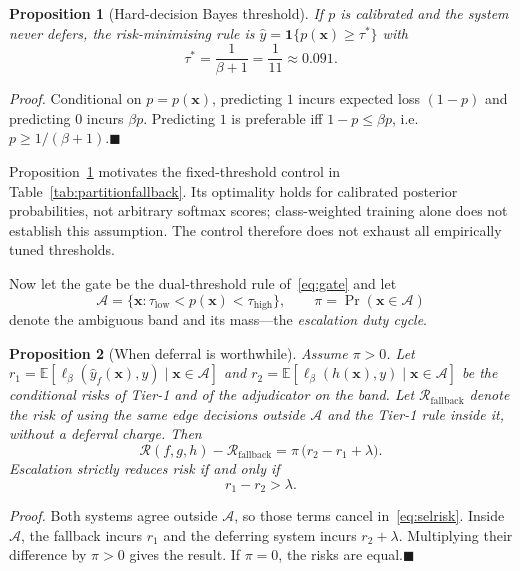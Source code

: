 \documentclass[journal]{IEEEtran}
\newtheorem{proposition}{Proposition}
\newcommand{\proofpar}[1]{\par\noindent\textit{Proof.} #1\hfill$\blacksquare$\par\medskip}
\begin{document}
\begin{proposition}[Hard-decision Bayes threshold]
\label{prop:bayes}
If $p$ is calibrated and the system never defers, the risk-minimising rule is $\hat{y}=\mathbf{1}\{p(\mathbf{x})\ge\tau^\ast\}$ with
\begin{equation}
\tau^{\ast}=\frac{1}{\beta+1}=\frac{1}{11}\approx 0.091 .
\label{eq:tau_star}
\end{equation}
\end{proposition}
\proofpar{Conditional on $p=p(\mathbf{x})$, predicting $1$ incurs expected loss $(1-p)$ and predicting $0$ incurs $\beta p$. Predicting $1$ is preferable iff $1-p\le\beta p$, i.e.\ $p\ge 1/(\beta{+}1)$.}

Proposition~\ref{prop:bayes} motivates the fixed-threshold control in Table~\ref{tab:partitionfallback}. Its optimality holds for calibrated posterior probabilities, not arbitrary softmax scores; class-weighted training alone does not establish this assumption. The control therefore does not exhaust all empirically tuned thresholds.

Now let the gate be the dual-threshold rule of~\eqref{eq:gate} and let
\begin{equation}
\mathcal{A}=\{\mathbf{x}:\tau_{\mathrm{low}}<p(\mathbf{x})<\tau_{\mathrm{high}}\},\qquad \pi=\Pr(\mathbf{x}\in\mathcal{A})
\label{eq:band}
\end{equation}
denote the ambiguous band and its mass---the \emph{escalation duty cycle}.

\begin{proposition}[When deferral is worthwhile]
\label{prop:defer}
Assume $\pi>0$. Let $r_1=\mathbb{E}[\ell_\beta(\hat{y}_f(\mathbf{x}),y)\mid\mathbf{x}\in\mathcal{A}]$ and $r_2=\mathbb{E}[\ell_\beta(h(\mathbf{x}),y)\mid\mathbf{x}\in\mathcal{A}]$ be the conditional risks of Tier-1 and of the adjudicator on the band. Let $\mathcal{R}_{\mathrm{fallback}}$ denote the risk of using the same edge decisions outside $\mathcal{A}$ and the Tier-1 rule inside it, without a deferral charge. Then
\begin{equation}
\mathcal{R}(f,g,h)-\mathcal{R}_{\mathrm{fallback}}=\pi\,\big(r_2-r_1+\lambda\big).
\label{eq:deferdelta}
\end{equation}
Escalation strictly reduces risk if and only if
\begin{equation}
r_1-r_2>\lambda .
\label{eq:defercond}
\end{equation}
\end{proposition}
\proofpar{Both systems agree outside $\mathcal{A}$, so those terms cancel in~\eqref{eq:selrisk}. Inside $\mathcal{A}$, the fallback incurs $r_1$ and the deferring system incurs $r_2+\lambda$. Multiplying their difference by $\pi>0$ gives the result. If $\pi=0$, the risks are equal.}
\end{document}
